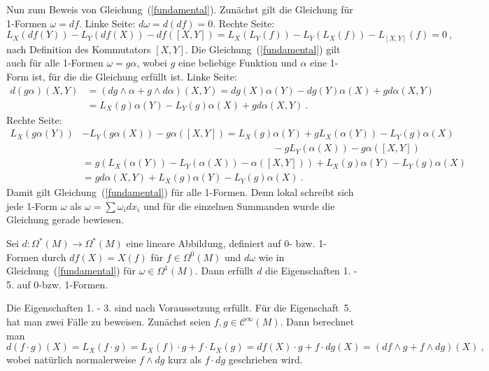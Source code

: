 \documentclass[12pt,a4paper]{article}
\begin{document}
Nun zum Beweis von Gleichung~(\ref{fundamental}). Zun\"achst gilt die Gleichung f\"ur 1-Formen
$\omega = df$. Linke Seite: $ d\omega = d(df)=0$. Rechte Seite:
$$
 L_X(df (Y)) - L_Y(df(X)) - df([X, Y]) = L_X(L_Y(f)) - L_Y(L_X(f)) - L_{[X, Y]}(f) = 0 \ ,
$$
nach Definition des Kommutators $[X,Y]$. Die Gleichung~(\ref{fundamental}) gilt auch f\"ur alle
1-Formen $\omega = g \alpha$, wobei $g$ eine beliebige Funktion und $\alpha$ eine 1-Form ist, f\"ur
die die Gleichung erf\"ullt ist. Linke Seite:
$$
\begin{array}{rl}
d(g\alpha)(X,Y)
& = (dg \wedge \alpha + g \wedge d\alpha)(X,Y)
= dg(X)\alpha(Y) - dg(Y)\alpha(X) + gd\alpha(X,Y)\\[1.5ex]
& = L_X(g)\alpha(Y) - L_Y(g)\alpha(X) + gd\alpha(X,Y) \ .
\end{array}
$$
Rechte Seite:
$$
\begin{array}{rl}
L_X(g\alpha(Y)) & - L_Y(g\alpha(X)) - g\alpha([X,Y])
 =
L_X(g) \alpha(Y) + gL_X(\alpha(Y)) - L_Y(g)\alpha(X) \\[1ex]
& \phantom{xxxxxxxxxxxxxxxxxxxxxxxxxxxxxxxxxx} - g L_Y(\alpha(X)) -g \alpha([X,Y]) \\[1.5ex]
& =
g( L_X(\alpha(Y)) - L_Y(\alpha(X)) - \alpha([X,Y])) + L_X(g) \alpha(Y) - L_Y(g)\alpha(X)\\[1.5ex]
& =
g d\alpha(X,Y) + L_X(g) \alpha(Y) - L_Y(g)\alpha(X) \ .
\end{array}
$$
Damit gilt Gleichung~(\ref{fundamental}) f\"ur alle 1-Formen. Denn lokal schreibt sich jede
1-Form $\omega$ als $\omega = \sum \omega_i dx_i$ und f\"ur die einzelnen Summanden wurde
die Gleichung gerade bewiesen.

\medskip

Sei $d: \Omega^*(M) \rightarrow \Omega^*(M)$ eine lineare Abbildung, definiert auf 0- bzw. 1-Formen
durch  $df(X)=X(f)$ f\"ur $f\in \Omega^0(M)$ und $d\omega$ wie in Gleichung~(\ref{fundamental}) f\"ur
$\omega \in \Omega^1(M)$. Dann erf\"ullt $d$ die Eigenschaften 1. - 5. auf 0-bzw. 1-Formen.

Die Eigenschaften 1. - 3. sind nach Voraussetzung erf\"ullt. F\"ur die Eigenschaft~5. hat man zwei
F\"alle zu beweisen. Zun\"achst seien $f, g \in \mathcal C^\infty(M)$. Dann berechnet man
$$
d(f\cdot g)(X) = L_X(f\cdot g) = L_X(f)\cdot g + f\cdot L_X(g)
=
df(X)\cdot g + f \cdot dg(X)
=
(df \wedge g + f \wedge dg)(X) \ ,
$$
wobei nat\"urlich normalerweise $f \wedge dg$ kurz als  $ f \cdot dg$ geschrieben wird.

\medskip
\end{document}
